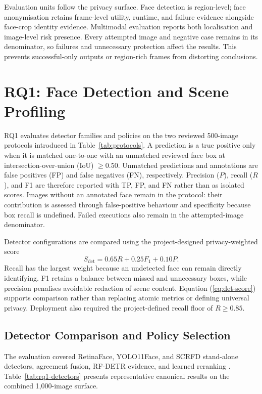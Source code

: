 \documentclass[10pt,twocolumn]{IEEEtran}
\begin{document}
Evaluation units follow the privacy surface. Face detection is region-level;
face anonymisation retains frame-level utility, runtime, and failure evidence
alongside face-crop identity evidence. Multimodal evaluation reports both
localisation and image-level risk presence. Every attempted image and negative
case remains in its denominator, so failures and unnecessary protection affect
the results. This prevents successful-only outputs or region-rich frames from
distorting conclusions.

\clearpage

\section{RQ1: Face Detection and Scene Profiling}
\label{sec:rq1}

RQ1 evaluates detector families and policies on the two reviewed 500-image
protocols introduced in Table~\ref{tab:protocols}. A prediction is a true
positive only when it is matched one-to-one with an unmatched reviewed face box
at intersection-over-union (IoU) $\geq 0.50$. Unmatched predictions and
annotations are false positives (FP) and false negatives (FN), respectively.
Precision ($P$), recall ($R$), and F1 are therefore reported with TP, FP, and FN
rather than as isolated scores. Images without an annotated face remain in the
protocol: their contribution is assessed through false-positive behaviour and
specificity because box recall is undefined. Failed executions also remain in
the attempted-image denominator.

Detector configurations are compared using the project-designed
privacy-weighted score
\begin{equation}
S_{\mathrm{det}}=0.65R+0.25F_{1}+0.10P .
\label{eq:det-score}
\end{equation}
Recall has the largest weight because an undetected face can remain directly
identifying. F1 retains a balance between missed and unnecessary boxes, while
precision penalises avoidable redaction of scene content. Equation
(\ref{eq:det-score}) supports comparison rather than replacing atomic metrics
or defining universal privacy. Deployment also required the project-defined
recall floor of $R\geq0.85$.

\subsection{Detector Comparison and Policy Selection}

The evaluation covered RetinaFace, YOLO11Face, and SCRFD stand-alone detectors,
agreement fusion, RF-DETR evidence, and learned reranking
\cite{redmon2016yolo,carion2020detr,guo2022scrfd,breiman2001randomforests}.
Table~\ref{tab:rq1-detectors} presents representative canonical results on the
combined 1,000-image surface.
\end{document}
